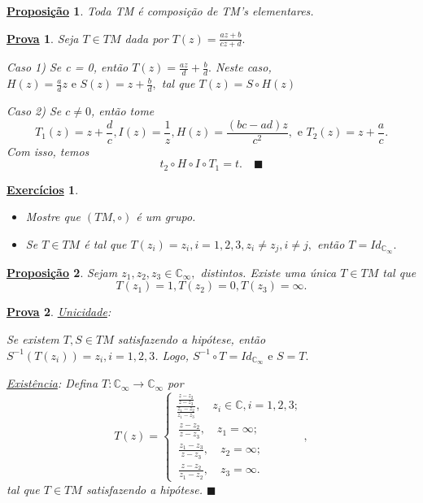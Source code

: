 \documentclass{article}
\newtheorem*{proof*}{\underline{Prova}}
\newtheorem*{prop*}{\underline{Proposi\c c\~ao}}
\newtheorem*{exer*}{\underline{Exerc\'icios}}
\renewcommand\qedsymbol{$\blacksquare$}
\begin{document}
 \begin{prop*}
   Toda TM \'e composi\c c\~ao de TM's elementares.
 \end{prop*}
 \begin{proof*}
   Seja $T\in{TM}$ dada por $T(z) = \displaystyle\frac{az + b}{cz + d}.$

   Caso 1) Se c = 0, ent\~ao $T(z) = \frac{az}{d} + \frac{b}{d}.$ Neste caso, $H(z) = \frac{a}{d}z \text{ e } S(z) = z + \frac{b}{d},$
   tal que $T(z) = S\circ{H(z)}$

  Caso 2) Se $c\neq0$, ent\~ao tome 
  $$
   T_1(z) = z + \frac{d}{c}, I(z) = \frac{1}{z}, H(z) = \frac{(bc - ad)z}{c^2}, \text{ e } T_2(z) = z + \frac{a}{c}.
  $$
Com isso, temos 
  $$
  t_2\circ{H}\circ{I}\circ{T_1} = t. \quad \text{\qedsymbol}
  $$
 \end{proof*}
\begin{exer*}
 \begin{itemize}
   \item[1)]Mostre que $(TM, \circ)$ \'e um grupo.
   \item[2)] Se $T\in{TM}$ \'e tal que $T(z_{i}) = z_{i}, i = 1, 2, 3, z_{i}\neq z_{j}, i\neq{j},$ ent\~ao $T = Id_{\mathbb{C}_{\infty}}.$
 \end{itemize}
\end{exer*} 
 \begin{prop*}
   Sejam $z_1, z_2, z_3\in \mathbb{C}_{\infty}, $ distintos. Existe uma \'unica $T\in{TM}$ tal que
   $$
    T(z_1) = 1, T(z_2) = 0, T(z_3) = \infty.
   $$
 \end{prop*}
\begin{proof*}
  \underline{Unicidade}: 

  Se existem $T, S\in{TM}$ satisfazendo a hip\'otese, ent\~ao $S^{-1}(T(z_i)) = z_{i}, i=1, 2, 3$. Logo, 
  $S^{-1}\circ{T} = Id_{\mathbb{C}_{\infty}} \text{ e } S = T.$

  \underline{Exist\^encia}: Defina $T:\mathbb{C}_{\infty}\rightarrow \mathbb{C}_{\infty}$ por 
  $$
  T(z) = \left\{\begin{array}{ll}
      \displaystyle\frac{\frac{z-z_2}{z-z_3}}{\frac{z_1-z_2}{z_1-z_3}}, \quad z_{i}\in \mathbb{C}, i=1, 2, 3; \\\
      \displaystyle\frac{z-z_2}{z-z_3}, \quad z_1 = \infty; \\\
      \displaystyle\frac{z_1 - z_3}{z - z_3}, \quad z_2 = \infty; \\\
      \displaystyle\frac{z - z_2}{z_1 - z_2}, \quad z_3 = \infty.
    \end{array}\right.,
  $$
  tal que $T\in{TM}$ satisfazendo a hip\'otese. \qedsymbol
\end{proof*}
\end{document}
